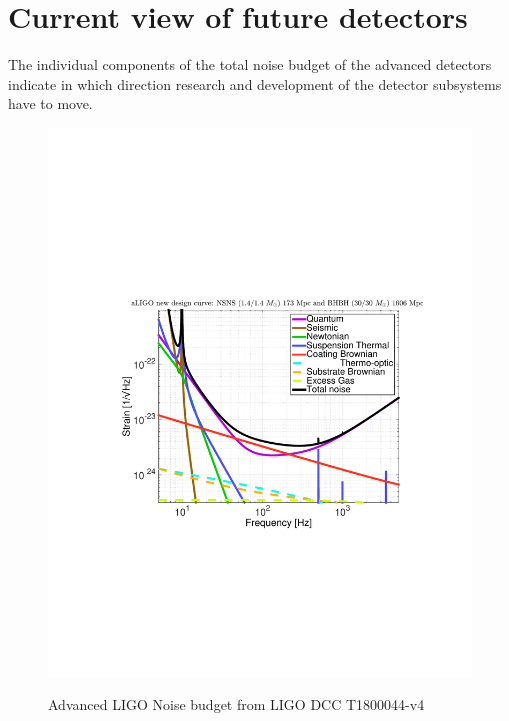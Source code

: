 \section{Current view of future detectors}
\label{sec: future_detectors}        
The individual components of the total noise budget of the advanced detectors indicate in which direction research and development of the detector subsystems have to move.

\begin{figure}[ht]
\includegraphics[width=\textwidth]{Figures/aLIGO_new.pdf}
\label{fig:ALIGOSensitivity}
\caption[Advanced LIGO Noise budget]{Advanced LIGO Noise budget from LIGO DCC T1800044-v4 }
\end{figure}



